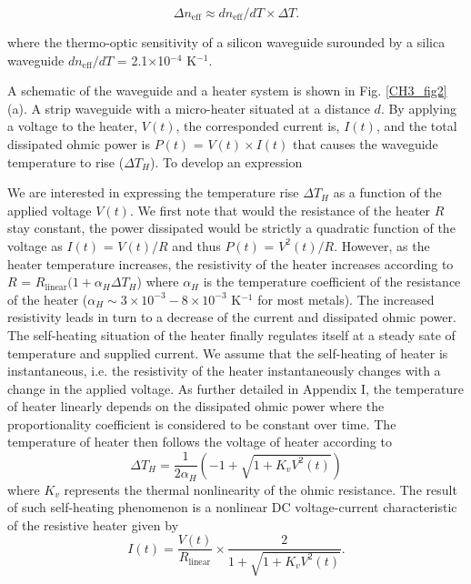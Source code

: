 \begin{equation}
\label{CH3_eq1}
     \Delta n_\text{eff} \approx dn_\text{eff}/dT \times \Delta T.
\end{equation}

where the thermo-optic sensitivity of a silicon waveguide surounded by a silica waveguide $dn_\text{eff}/dT$ =  2.1$\times$10$^{-4}$ K$^{-1}$. 

A schematic of the waveguide and a heater system is shown in Fig. \ref{CH3_fig2}(a). A strip waveguide with a micro-heater situated at a distance $d$. By applying a voltage to the heater, $V(t)$, the corresponded current is, $I(t)$, and the total dissipated ohmic power is $P(t)$ = $V(t)\times I(t)$ that causes the waveguide temperature to rise ($\Delta T_H$). To develop an expression

We are interested in expressing the temperature rise $\Delta T_H$ as a function of the applied voltage $V(t)$. We first note that would the resistance of the heater $R$ stay constant, the power dissipated would be strictly a quadratic function of the voltage as $I(t)$ = $V(t)/R$ and thus $P(t)$ = $V^2 (t)/R$. However, as the heater temperature increases, the resistivity of the heater increases according to $R$ = $R_\text{linear} (1 + \alpha_H \Delta T_H$) where $\alpha_H$ is the temperature coefficient of the resistance of the heater ($\alpha_H \sim 3\times 10^{-3}-8\times 10^{-3}$ K$^{-1}$ for most metals). The increased resistivity leads in turn to a decrease of the current and dissipated ohmic power. The self-heating situation of the heater finally regulates itself at a steady sate of temperature and supplied current. We assume that the self-heating of heater is instantaneous, i.e. the resistivity of the heater instantaneously changes with a change in the applied voltage. As further detailed in Appendix I, the temperature of heater linearly depends on the dissipated ohmic power where the proportionality coefficient is considered to be constant over time. The temperature of heater then follows the voltage of heater according to
%
\begin{equation}\label{CH3_eq2}
\Delta T_H = \frac{1}{2\alpha_H}\left(-1+\sqrt{1 + K_v V^2 (t)}\right)
\end{equation}
%
where $K_v$ represents the thermal nonlinearity of the ohmic resistance. The result of such self-heating phenomenon is a nonlinear DC voltage-current characteristic of the resistive heater given by
%
\begin{equation}\label{CH3_eq3}
I(t) = \frac{V(t)}{R_\text{linear}}\times \frac{2}{1+\sqrt{1 + K_v V^2 (t)}} .
\end{equation}
